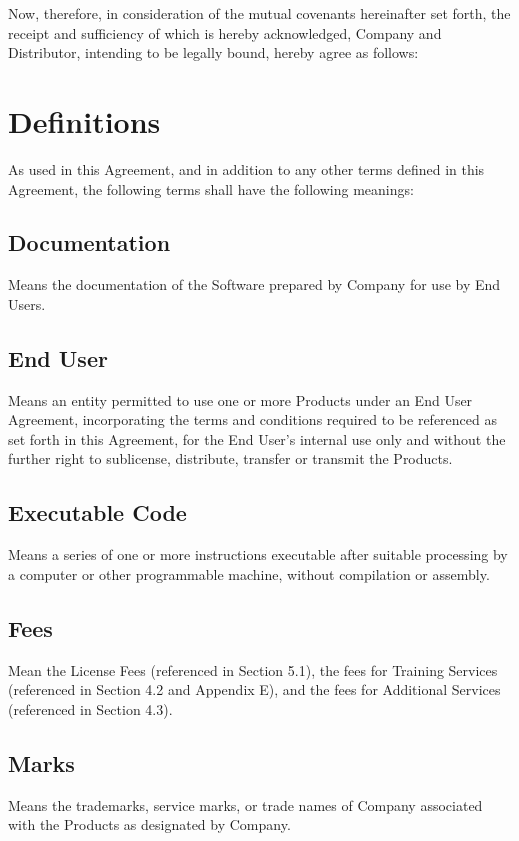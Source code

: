 \documentclass[letterpaper,10pt,english]{sphinxmanual}
\begin{document}
Now, therefore, in consideration of the mutual covenants hereinafter set forth, the receipt and sufficiency of which is hereby acknowledged, Company and Distributor, intending to be legally bound, hereby agree as follows:


\section{Definitions}
\label{\detokenize{definitions:definitions}}\label{\detokenize{definitions::doc}}
As used in this Agreement, and in addition to any other terms defined in this Agreement, the following terms shall have the following meanings:


\subsection{Documentation}
\label{\detokenize{definitions:documentation}}
Means the documentation of the Software prepared by Company for use by End Users.


\subsection{End User}
\label{\detokenize{definitions:end-user}}
Means an entity permitted to use one or more Products under an End User Agreement, incorporating the terms and conditions required to be referenced as set forth in this Agreement, for the End User’s internal use only and without the further right to sublicense, distribute, transfer or transmit the Products.


\subsection{Executable Code}
\label{\detokenize{definitions:executable-code}}
Means a series of one or more instructions executable after suitable processing by a computer or other programmable machine, without compilation or assembly.


\subsection{Fees}
\label{\detokenize{definitions:fees}}
Mean the License Fees (referenced in Section 5.1), the fees for Training Services (referenced in Section 4.2 and Appendix E), and the fees for Additional Services (referenced in Section 4.3).


\subsection{Marks}
\label{\detokenize{definitions:marks}}
Means the trademarks, service marks, or trade names of Company associated with the Products as designated by Company.
\end{document}
